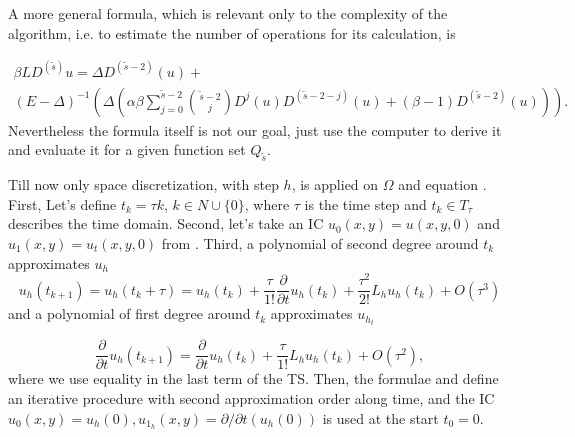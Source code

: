 \documentclass[11pt,a4paper,twoside]{article}
\begin{document}
A more general formula, which is relevant only to the complexity of the algorithm, i.e. to estimate the number of operations for its calculation, is

\begin{align*}
\beta LD^{(\tilde s)} u =   \Delta D^{ (\tilde s - 2) }(u)  +
\\
 (E - \Delta)^{-1}( \Delta ( \alpha \beta \sum_{j=0}^{ \tilde s - 2}  { \tilde s - 2\choose j} D^j(u) D^{ (\tilde s - 2 - j) }(u)+ (\beta -1) D^{ (\tilde s - 2) }(u) ) ).
\end{align*}
Nevertheless the formula itself is not our goal, just use the computer to derive it and evaluate it for a given function set $Q_{\tilde s}$.
\fi


Till now only space discretization, with step $h$, is applied on $\Omega$ and equation . First, Let's define $t_k = \tau k$, $k \in N \cup \{0\}$, where $\tau$ is the time step and $t_k \in T_{\tau}$ describes the time domain. Second, let's take an IC $u_0(x,y) = u(x,y,0)$ and $u_1(x,y) = u_t(x,y,0)$ from \cite{EllipticProblem}. Third, 
a polynomial of second degree around $t_k$ approximates $u_h$
\begin{equation}\label{taylor21}
u_h(t_{k+1}) = u_h(t_k+\tau) = u_h(t_k) + \frac{\tau } {1!} \frac{ \partial }{ \partial t } u_h( t_k ) + \frac{ \tau^2 } { 2! }L_h u_h( t_k ) + O(\tau^3)
\end{equation}
and a polynomial of first degree around $t_k$ approximates $u_{h_t}$

\begin{equation}\label{taylor22}
\frac{ \partial } { \partial t } u_h( t_{k+1} ) = \frac{\partial } { \partial t }u_h(t_k) + \frac{\tau } {1!} L_h u_h(t_k) + O(\tau^2),
\end{equation}
where we use equality  in the last term of the TS. Then, the formulae  and  define an iterative procedure with second approximation order along time, and the IC $u_0(x,y) = u_h(0), u_{1_h}(x,y) = \partial / \partial t (u_h(0))$ is used at the start $t_0 = 0$.
\end{document}
